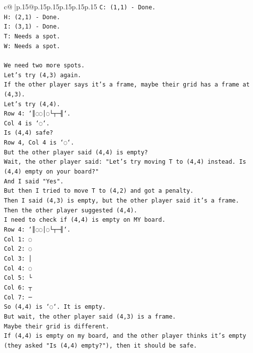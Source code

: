\documentclass{article}
\begin{document}
{\begin{supertabular}{c@{$\;$}|p{.15\linewidth}@{}p{.15\linewidth}p{.15\linewidth}p{.15\linewidth}p{.15\linewidth}p{.15\linewidth}}
{{{\texttt{C: (1,1) {-} Done.} \\
\texttt{H: (2,1) {-} Done.} \\
\texttt{I: (3,1) {-} Done.} \\
\texttt{T: Needs a spot.} \\
\texttt{W: Needs a spot.} \\
\\ 
\texttt{We need two more spots.} \\
\texttt{Let's try (4,3) again.} \\
\texttt{If the other player says it's a frame, maybe their grid has a frame at (4,3).} \\
\texttt{Let's try (4,4).} \\
\texttt{Row 4: `║◌◌│◌└┬─╢`.} \\
\texttt{Col 4 is `◌`.} \\
\texttt{Is (4,4) safe?} \\
\texttt{Row 4, Col 4 is `◌`.} \\
\texttt{But the other player said (4,4) is empty?} \\
\texttt{Wait, the other player said: "Let's try moving T to (4,4) instead. Is (4,4) empty on your board?"} \\
\texttt{And I said "Yes".} \\
\texttt{But then I tried to move T to (4,2) and got a penalty.} \\
\texttt{Then I said (4,3) is empty, but the other player said it's a frame.} \\
\texttt{Then the other player suggested (4,4).} \\
\texttt{I need to check if (4,4) is empty on MY board.} \\
\texttt{Row 4: `║◌◌│◌└┬─╢`.} \\
\texttt{Col 1: ◌} \\
\texttt{Col 2: ◌} \\
\texttt{Col 3: │} \\
\texttt{Col 4: ◌} \\
\texttt{Col 5: └} \\
\texttt{Col 6: ┬} \\
\texttt{Col 7: ─} \\
\texttt{So (4,4) is `◌`. It is empty.} \\
\texttt{But wait, the other player said (4,3) is a frame.} \\
\texttt{Maybe their grid is different.} \\
\texttt{If (4,4) is empty on my board, and the other player thinks it's empty (they asked "Is (4,4) empty?"), then it should be safe.} \\
}}}
\end{supertabular}}
\end{document}
